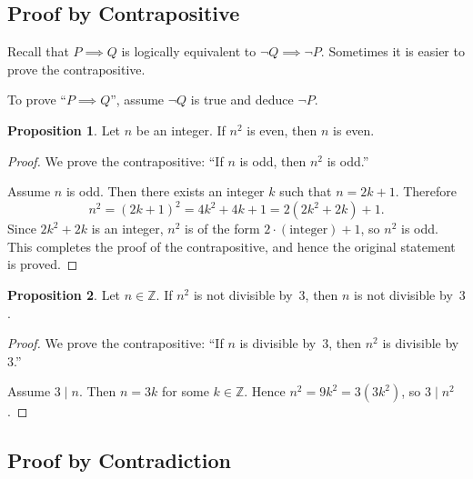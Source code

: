 \documentclass[12pt,a4paper,openany]{book}
\newcommand{\Z}{\mathbb{Z}}
\theoremstyle{definition}
\newtheorem{proposition}{Proposition}[chapter]
\theoremstyle{remark}
\begin{document}
\subsection{Proof by Contrapositive}
\label{subsec:contrapositive}

Recall that $P \implies Q$ is logically equivalent to $\neg Q \implies \neg P$.
Sometimes it is easier to prove the contrapositive.

\begin{strategy}
To prove ``$P \implies Q$'', assume $\neg Q$ is true and deduce $\neg P$.
\end{strategy}

\begin{proposition}\label{prop:n-squared-even}
Let $n$ be an integer.  If $n^2$ is even, then $n$ is even.
\end{proposition}

\begin{proof}
We prove the contrapositive: ``If $n$ is odd, then $n^2$ is odd.''

Assume $n$ is odd.  Then there exists an integer $k$ such that $n = 2k+1$.
Therefore
\[
  n^2 = (2k+1)^2 = 4k^2 + 4k + 1 = 2(2k^2 + 2k) + 1.
\]
Since $2k^2+2k$ is an integer, $n^2$ is of the form $2\cdot(\text{integer})+1$,
so $n^2$ is odd.  This completes the proof of the contrapositive, and hence
the original statement is proved.
\end{proof}

\begin{proposition}\label{prop:contrapositive-div}
Let $n \in \Z$.  If $n^2$ is not divisible by~$3$, then $n$ is not divisible
by~$3$.
\end{proposition}

\begin{proof}
We prove the contrapositive: ``If $n$ is divisible by~$3$, then $n^2$ is
divisible by~$3$.''

Assume $3 \mid n$.  Then $n = 3k$ for some $k \in \Z$.  Hence
$n^2 = 9k^2 = 3(3k^2)$, so $3 \mid n^2$.
\end{proof}

\subsection{Proof by Contradiction}
\label{sec:contradiction}
\end{document}
